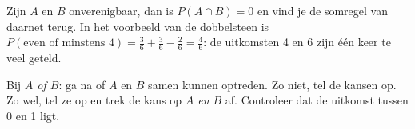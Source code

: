Zijn $A$ en $B$ onverenigbaar, dan is $P(A \cap B) = 0$ en vind je de somregel van daarnet terug. In het voorbeeld van de dobbelsteen is $P(\text{even of minstens 4}) = \frac36 + \frac36 - \frac26 = \frac46$: de uitkomsten 4 en 6 zijn één keer te veel geteld.


\begin{werkwijze}
Bij \textit{$A$ of $B$}: ga na of $A$ en $B$ samen kunnen optreden. Zo niet, tel de kansen op. Zo wel, tel ze op en trek de kans op \textit{$A$ en $B$} af. Controleer dat de uitkomst tussen 0 en 1 ligt.
\end{werkwijze}

\begin{oefeningen}

\end{oefeningen}

\opdrachtenkop

\begin{oefeningen}


























\end{oefeningen}


